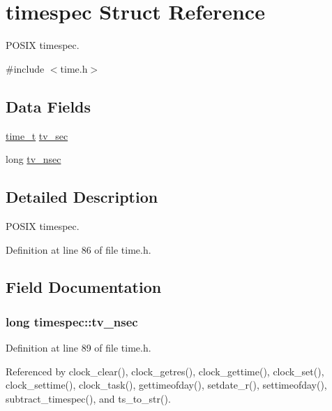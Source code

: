 \hypertarget{structtimespec}{}\section{timespec Struct Reference}
\label{structtimespec}


P\+O\+S\+IX timespec.  




{\ttfamily \#include $<$time.\+h$>$}

\subsection*{Data Fields}
\begin{DoxyCompactItemize}
\item 
\hyperlink{time_8h_a3346b04b0420b32ccf6b706551b70762}{time\+\_\+t} \hyperlink{structtimespec_afc3302668d7cb5952f590da69fdd4955}{tv\+\_\+sec}
\item 
long \hyperlink{structtimespec_ae3c7510dafa8cbcaede866ed13c99683}{tv\+\_\+nsec}
\end{DoxyCompactItemize}


\subsection{Detailed Description}
P\+O\+S\+IX timespec. 

Definition at line 86 of file time.\+h.



\subsection{Field Documentation}
\subsubsection[{\texorpdfstring{tv\+\_\+nsec}{tv_nsec}}]{\setlength{\rightskip}{0pt plus 5cm}long timespec\+::tv\+\_\+nsec}\hypertarget{structtimespec_ae3c7510dafa8cbcaede866ed13c99683}{}\label{structtimespec_ae3c7510dafa8cbcaede866ed13c99683}


Definition at line 89 of file time.\+h.



Referenced by clock\+\_\+clear(), clock\+\_\+getres(), clock\+\_\+gettime(), clock\+\_\+set(), clock\+\_\+settime(), clock\+\_\+task(), gettimeofday(), setdate\+\_\+r(), settimeofday(), subtract\+\_\+timespec(), and ts\+\_\+to\+\_\+str().

